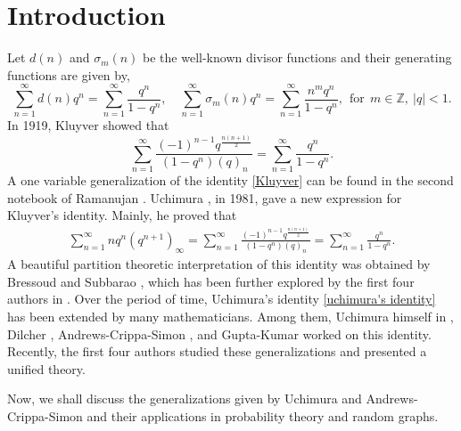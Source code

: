 \documentclass[11pt,reqno]{amsart}
\renewcommand{\(}{\left\(}
\renewcommand{\)}{\right\)}
\renewcommand{\[}{\left\[}
\renewcommand{\]}{\right\]}
\numberwithin{equation}{section}
\theoremstyle{plain}
\begin{document}
\section{Introduction}
Let $d(n)$ and $\sigma_{m}(n)$ be the well-known divisor functions and their generating functions are given by,  $$ \sum_{n=1}^\infty d(n) q^n= \sum_{n=1}^\infty\frac{q^n}{1-q^n},  \quad  \sum_{n=1}^\infty \sigma_{m}(n) q^n = \sum_{n=1}^\infty \frac{n^m q^n}{1-q^n},   ~~\textrm{for}~~m \in \mathbb{Z}, ~ |q|<1.$$
In 1919,  Kluyver \cite{kluyver} showed that 
\begin{equation}\label{Kluyver}
\sum_{n=1}^{\infty} \frac{(-1)^{n-1} q^{\frac{n(n+1)}{2}}}{(1-q^n) ( q)_n  } = \sum_{n=1}^{\infty} \frac{ q^n }{1-q^n}.
\end{equation}
A one variable generalization of the identity \eqref{Kluyver} can be found in the second notebook of Ramanujan \cite[p.~354]{ramanujanoriginalnotebook2}.  
Uchimura \cite{uchimura81}, in 1981,  gave a new expression for Kluyver's identity.  Mainly,  he proved that
\begin{align}\label{uchimura's identity}
\sum_{n=1}^\infty nq^n(q^{n+1})_\infty=\sum_{n=1}^\infty \frac{(-1)^{n-1} q^{ \frac{n(n+1)}{2}}}{(1-q^n)(q)_n}=\sum_{n=1}^\infty\frac{q^n}{1-q^n}.
\end{align}
A beautiful partition theoretic interpretation of this identity was obtained by Bressoud and Subbarao \cite{bresub},  which has been further explored by the first four authors in \cite{ABEM}.  Over the period of time,  Uchimura's identity \eqref{uchimura's identity} has been extended by many mathematicians.  Among them,  Uchimura himself in \cite{uchimura87},     Dilcher \cite{dilcher},   Andrews-Crippa-Simon \cite{andrewssiam1997},  and  Gupta-Kumar \cite{GK21} worked on this identity.    Recently,   the first four authors \cite{ABEM24} studied these generalizations and presented a unified theory.  





Now,  we shall discuss the generalizations given by Uchimura \cite{uchimura87} and Andrews-Crippa-Simon \cite{andrewssiam1997} and their applications in probability theory and random graphs.    
\end{document}

